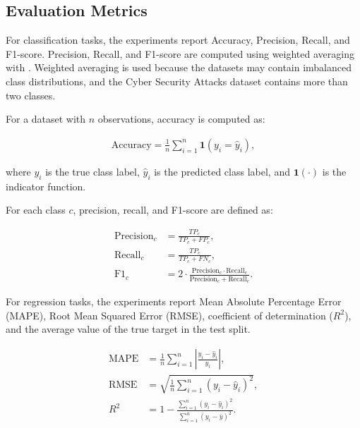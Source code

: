 \subsection{Evaluation Metrics}

\hs For classification tasks, the experiments report Accuracy, Precision, Recall, and F1-score. Precision, Recall, and F1-score are computed using weighted averaging with . Weighted averaging is used because the datasets may contain imbalanced class distributions, and the Cyber Security Attacks dataset contains more than two classes.

For a dataset with $n$ observations, accuracy is computed as:

\begin{align*}
    \text{Accuracy} = \frac{1}{n}\sum_{i=1}^{n}\mathbf{1}(y_i = \hat{y}_i),
\end{align*}

where $y_i$ is the true class label, $\hat{y}_i$ is the predicted class label, and $\mathbf{1}(\cdot)$ is the indicator function.

For each class $c$, precision, recall, and F1-score are defined as:

\begin{align*}
    \text{Precision}_c & = \frac{TP_c}{TP_c + FP_c},                                                                       \\[0.5em]
    \text{Recall}_c    & = \frac{TP_c}{TP_c + FN_c},                                                                       \\[0.5em]
    \text{F1}_c        & = 2 \cdot \frac{\text{Precision}_c \cdot \text{Recall}_c} {\text{Precision}_c + \text{Recall}_c}.
\end{align*}

For regression tasks, the experiments report Mean Absolute Percentage Error (MAPE), Root Mean Squared Error (RMSE), coefficient of determination ($R^2$), and the average value of the true target in the test split.

\begin{align*}
    \text{MAPE} & =
    \frac{1}{n}\sum_{i=1}^{n}
    \left|\frac{y_i - \hat{y}_i}{y_i}\right|,            \\
    \text{RMSE} & =
    \sqrt{\frac{1}{n}\sum_{i=1}^{n}(y_i - \hat{y}_i)^2}, \\
    R^2         & =
    1 -
    \frac{\sum_{i=1}^{n}(y_i - \hat{y}_i)^2}
    {\sum_{i=1}^{n}(y_i - \bar{y})^2}.
\end{align*}

